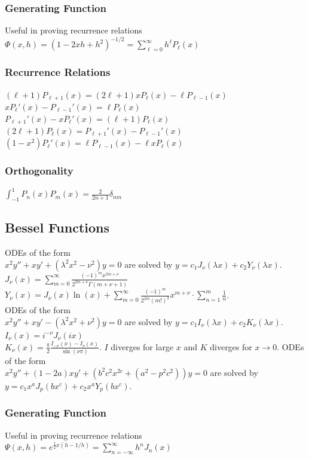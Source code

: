 \documentclass[10pt,landscape,letterpaper]{cheatsheet}
\begin{document}
\subsubsection{Generating Function}
Useful in proving recurrence relations
$\Phi(x,h)=\left(1-2xh+h^2\right)^{-1/2}=\sum_{\ell=0}^{\infty}h^\ell P_\ell(x)$
\subsubsection{Recurrence Relations}
$(\ell+1)P_{\ell+1}(x)=(2\ell+1)xP_\ell(x)-\ell P_{\ell-1}(x)$\\
$xP_\ell'(x)-P_{\ell-1}'(x)=\ell P_\ell(x)$\\
$P_{\ell+1}'(x) -xP_\ell'(x)=(\ell+1)P_\ell(x)$\\
$(2\ell+1)P_\ell(x)=P_{\ell+1}'(x)-P_{\ell-1}'(x)$\\
$(1-x^2)P_\ell'(x)=\ell P_{\ell-1}(x)-\ell x P_\ell(x)$
\subsubsection{Orthogonality}
$\int_{-1}^{1}P_n(x)P_m(x)=\frac{2}{2n+1}\delta_{nm}$\\

\subsection{Bessel Functions}
ODEs of the form \\
$x^2y''+xy'+(\lambda^2x^2-\nu^2)y=0$
are solved by
$y=c_1J_\nu(\lambda x)+c_2Y_\nu(\lambda x)$.\\
$J_\nu(x)=\sum_{m=0}^\infty\frac{(-1)^mx^{2m+\nu}}{2^{2m+\nu}\Gamma(m+\nu+1)}$\\
$Y_\nu(x)=J_\nu(x)\ln(x) + \sum_{m=0}^\infty \frac{(-1)^m}{2^{2m}(m!)^2}x^{m+\nu}\cdot\sum_{n=1}^m\frac{1}{n}$.\\
ODEs of the form \\
$x^2y''+xy'-(\lambda^2x^2+\nu^2)y=0$
are solved by
$y=c_1I_\nu(\lambda x)+c_2K_\nu(\lambda x)$.\\
$I_\nu(x)=i^{-\nu}J_\nu(ix)$\\
$K_\nu(x)=\frac{\pi}{2}\frac{I_{-\nu}(x)-I_\nu(x)}{\sin(\nu\pi)}$. $I$ diverges for large $x$ and $K$ diverges for $x\to 0$.
ODEs of the form \\
$x^2y''+(1-2a)xy'+(b^2c^2x^{2c}+(a^2-p^2c^2))y=0$
are solved by
$y=c_1x^aJ_p(bx^c)+c_2x^aY_p(bx^c)$.\\
\subsubsection{Generating Function}
Useful in proving recurrence relations
$\Psi(x,h)=e^{\frac{1}{2}x(h-1/h)}=\sum_{n=-\infty}^{\infty}h^n J_n(x)$
\end{document}
